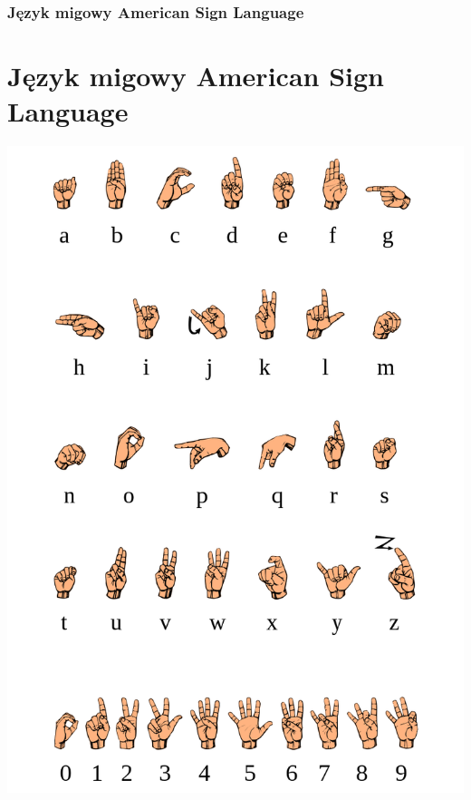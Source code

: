 \documentclass{beamer}
\begin{document}
	\begin{frame}
		\frametitle{Język migowy American Sign Language}
		\section{Język migowy American Sign Language}
		\begin{center}
			\includegraphics[scale=0.25]{Asl}
		\end{center}
	\end{frame}
\end{document}

